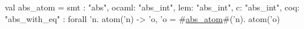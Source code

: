 val abs_atom = {
  smt : "abs",
  ocaml: "abs_int",
  lem: "abs_int",
  c: "abs_int",
  coq: "abs_with_eq"
} : forall 'n. atom('n) -> {'o, 'o = #\hyperref[zabszyatom]{abs\_atom}#('n). atom('o)}
